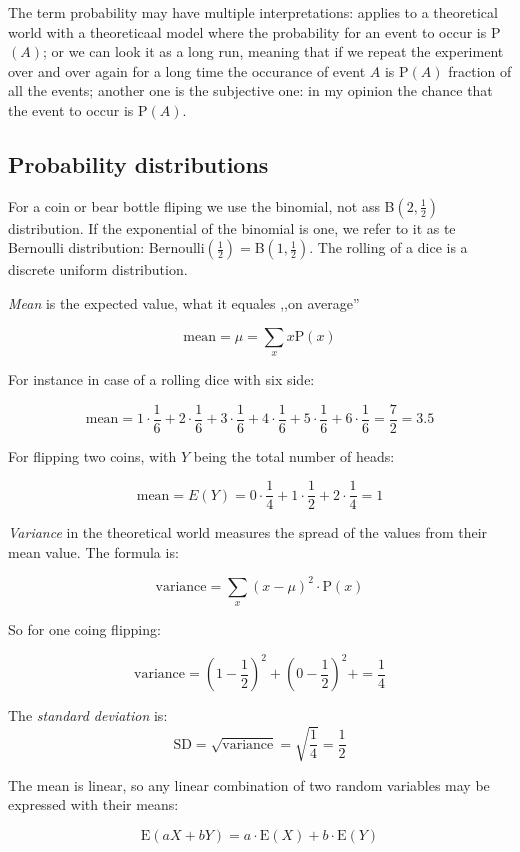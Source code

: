 The term probability may have multiple interpretations: applies to a theoretical
world with a theoreticaal model where the probability for an event to occur is
P$(A)$; or we can look it as a long run, meaning that if we repeat the
experiment over and over again for a long time the occurance of event $A$ is
P$(A)$ fraction of all the events; another one is the subjective one: in my
opinion the chance that the event to occur is P$(A)$.

\subsection{Probability distributions}

For a coin or bear bottle fliping we use the binomial, not ass
B$(2,\frac{1}{2})$  distribution. If the exponential of the binomial is
one, we refer to it as te Bernoulli distribution: Bernoulli$(\frac{1}{2}) =
$B$(1, \frac{1}{2})$. The rolling of a dice is a discrete uniform
distribution.

\emph{Mean} is the expected value, what it equales ,,on average'' 

\[ \mbox{mean} = \mu = \sum_{x}x\mbox{P}(x)
\]

For instance in case of a rolling dice with six side:

\[
\mbox{mean} =
1\cdot\frac{1}{6}+2\cdot\frac{1}{6}+3\cdot\frac{1}{6}+4\cdot\frac{1}{6}+5\cdot\frac{1}{6}+6\cdot\frac{1}{6}=\frac{7}{2}=3.5
\]

For flipping two coins, with $Y$ being the total number of heads: 

\[
\mbox{mean}=E(Y)= 0\cdot\frac{1}{4}+1\cdot\frac{1}{2}+2\cdot\frac{1}{4} = 1
\]

\emph{Variance} in the theoretical world measures the spread of the values from
their mean value. The formula is:

\[
\mbox{variance} = \sum_{x} (x-\mu)^2\cdot\mbox{P}(x) 
\]

So for one coing flipping:

\[ \mbox{variance} =  \left(1-\frac{1}{2}\right)^2 +
\left(0-\frac{1}{2}\right)^2 + =  \frac{1}{4} \]

The \emph{standard deviation} is: 
\[ \mbox{SD} = \sqrt{\mbox{variance}} = \sqrt{\frac{1}{4}} = \frac{1}{2}
\]

The mean is linear, so any linear combination of two random variables may be
expressed with their means:

\[ \mbox{E}(aX+bY) = a\cdot\mbox{E}(X) + b\cdot\mbox{E}(Y)\]

